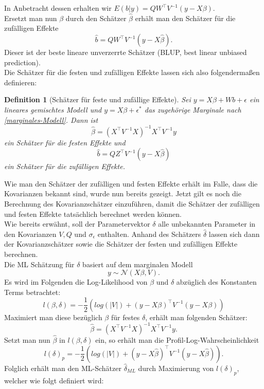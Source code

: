 \documentclass[%
thesis=student,%
coverpage=false,%
titlepage=false,%
headmarks=true, %
german,%
font=libertine, %
math=newpxtx, %
BCOR=5mm,%
coverBCOR=11mm%
]{tumbook}
\theoremstyle{break}
\newtheorem{definition}{Definition}[section]
\begin{document}
In Anbetracht dessen erhalten wir $E(b|y) = Q W^{\top}V^{-1}(y-X\beta)$. \\
Ersetzt man nun $\beta$ durch den Schätzer $\hat{\beta}$ erhält man den Schätzer für die zufälligen Effekte $$\hat{b} = Q W^{\top}V^{-1}(y-X\hat{\beta}).$$ Dieser ist der beste lineare unverzerrte Schätzer (BLUP, best linear unbiased prediction).\\
Die Schätzer für die festen und zufälligen Effekte lassen sich also folgendermaßen definieren:
\begin{definition}[Schätzer für feste und zufällige Effekte]
	Sei $y = X\beta + Wb + \epsilon$ ein lineares gemischtes Modell und $y=X\beta + \epsilon^*$ das zugehörige Marginale nach \ref{marginales-Modell}.
	Dann ist $$\hat{\beta} = (X^{\top} V^{-1}X)^{-1}X^{\top} V^{-1}y$$ ein Schätzer für die festen Effekte und $$ \hat{b} = Q Z^{\top}V^{-1}(y-X\hat{\beta})$$ ein Schätzer für die zufälligen Effekte.
\end{definition}\noindent
Wie man den Schätzer der zufälligen und festen Effekte erhält im Falle, dass die Kovarianzen bekannt sind, wurde nun bereits gezeigt. Jetzt gilt es noch die Berechnung des Kovarianzschätzer einzuführen, damit die Schätzer der zufälligen und festen Effekte tatsächlich berechnet werden können. \\
Wie bereits erwähnt, soll der Parametervektor $\delta$ alle unbekannten Parameter in den Kovarianzen $V, Q$ und $\sigma_\epsilon$ enthalten. Anhand des Schätzers $\hat{\delta}$  lassen sich dann der Kovarianzschätzer sowie die Schätzer der festen und zufälligen Effekte berechnen.\\ 
Die ML Schätzung für $\delta$ basiert auf dem marginalen Modell 
$$y \sim \mathcal{N}(X\beta,V).$$
Es wird im Folgenden die Log-Likelihood von $\beta$ und $\delta$ abzüglich des Konstanten Terms betrachtet: 
$$l(\beta,\delta) = - \frac{1}{2} (log(|V|)+(y-X\beta)^{\top}V^{-1}(y-X\beta))$$
Maximiert man diese bezüglich $\beta$ für festes $\delta$, erhält man folgenden Schätzer:
$$ \hat{\beta} = (X^{\top}V^{-1}X)^{-1}X^{\top}V^{-1}y.$$
Setzt man nun $\hat{\beta}$ in $l(\beta,\delta)$ ein, so erhält man die Profil-Log-Wahrscheinlichkeit 
$$ l(\delta)_p = - \frac{1}{2} (log(|V|)+(y-X\hat{\beta})^{\top}V^{-1}(y-X\hat{\beta})).$$
Folglich erhält man den ML-Schätzer $\hat{\delta}_{ML}$ durch Maximierung von $l(\delta)_p$, welcher wie folgt definiert wird:
\end{document}
